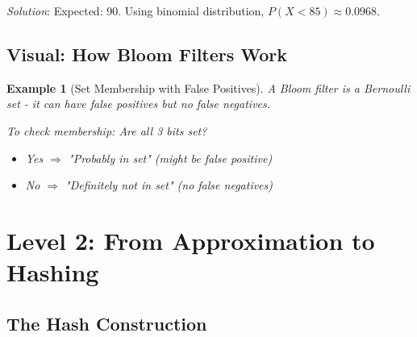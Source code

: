 \documentclass[11pt]{article}
\newtheorem{example}{Example}[section]
\begin{document}
\textit{Solution}: Expected: 90. Using binomial distribution, $P(X < 85) \approx 0.0968$.

\subsection{Visual: How Bloom Filters Work}

\begin{example}[Set Membership with False Positives]
A Bloom filter is a Bernoulli set - it can have false positives but no false negatives.

\begin{center}
\end{center}

To check membership: Are all 3 bits set? 
\begin{itemize}
    \item Yes $\Rightarrow$ "Probably in set" (might be false positive)
    \item No $\Rightarrow$ "Definitely not in set" (no false negatives)
\end{itemize}
\end{example}

\section{Level 2: From Approximation to Hashing}

\subsection{The Hash Construction}
\end{document}
